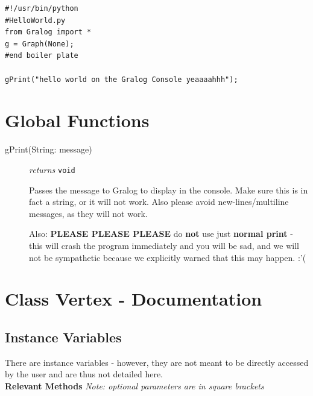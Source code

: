 \begin{lstlisting}
#!/usr/bin/python
#HelloWorld.py
from Gralog import *
g = Graph(None);
#end boiler plate

gPrint("hello world on the Gralog Console yeaaaahhh");
\end{lstlisting}

\section{Global Functions}
\begin{description}


\item[gPrint(String: message)] \emph{returns} \texttt{void}

Passes the message to Gralog to display in the console. Make sure this is in fact a string, or it will not work. Also please avoid new-lines/multiline messages, as they will not work.

Also: \textbf{PLEASE PLEASE PLEASE} do \textbf{not} use just \textbf{normal print} - this will crash the program immediately and you will be sad, and we will not be sympathetic because we explicitly warned that this may happen. :'(
\end{description}

\section{Class Vertex - Documentation}

\subsection{Instance Variables}
There are instance variables - however, they are not meant to be directly accessed by the user and are thus not detailed here.\\

\textbf{{\large Relevant Methods}}
\textit{Note: optional parameters are in square brackets}
